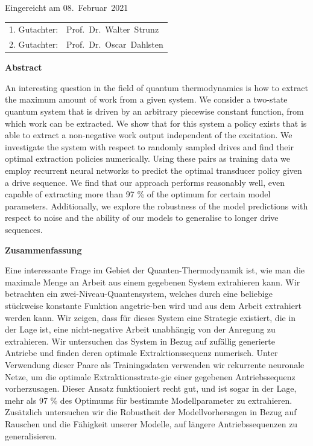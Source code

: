 \thispagestyle{empty}\vspace*{48em}

Eingereicht am 08.~Februar~2021\vspace{1.5em}
\par{\large\begin{tabular}{ll}
 1. Gutachter: & Prof.~Dr.~Walter~Strunz \\
 2. Gutachter: & Prof.~Dr.~Oscar~Dahlsten \\
\end{tabular}}


\newpage
\begin{center}\large\bfseries Abstract\end{center}
An interesting question in the field of quantum thermodynamics is how to extract the maximum amount of work from a given system.
We consider a two-state quantum system that is driven by an arbitrary piecewise constant function, from which work can be extracted.
We show that for this system a policy exists that is able to extract a non-negative work output independent of the excitation.
We investigate the system with respect to randomly sampled drives and find their optimal extraction policies numerically.
Using these pairs as training data we employ recurrent neural networks to predict the optimal transducer policy given a drive sequence.
We find that our approach performs reasonably well, even capable of extracting more than 97 \% of the optimum for certain model parameters.
Additionally, we explore the robustness of the model predictions with respect to noise and the ability of our models to generalise to longer drive sequences.

\vspace{10em}
\begin{center}\large\bfseries Zusammenfassung\end{center}
Eine interessante Frage im Gebiet der Quanten-Thermodynamik ist, wie man die maximale Menge an Arbeit aus einem gegebenen System extrahieren kann.
Wir betrachten ein zwei-Niveau-Quantensystem, welches durch eine beliebige stückweise konstante Funktion angetrie-ben wird und aus dem Arbeit extrahiert werden kann.
Wir zeigen, dass für dieses System eine Strategie existiert, die in der Lage ist, eine nicht-negative Arbeit unabhängig von der Anregung zu extrahieren.
Wir untersuchen das System in Bezug auf zufällig generierte Antriebe und finden deren optimale Extraktionssequenz numerisch.
Unter Verwendung dieser Paare als Trainingsdaten verwenden wir rekurrente neuronale Netze, um die optimale Extraktionsstrate-gie einer gegebenen Antriebssequenz vorherzusagen.
Dieser Ansatz funktioniert recht gut, und ist sogar in der Lage, mehr als 97 \% des Optimums für bestimmte Modellparameter zu extrahieren.
Zusätzlich untersuchen wir die Robustheit der Modellvorhersagen in Bezug auf Rauschen und die Fähigkeit unserer Modelle, auf längere Antriebssequenzen zu generalisieren.
 
